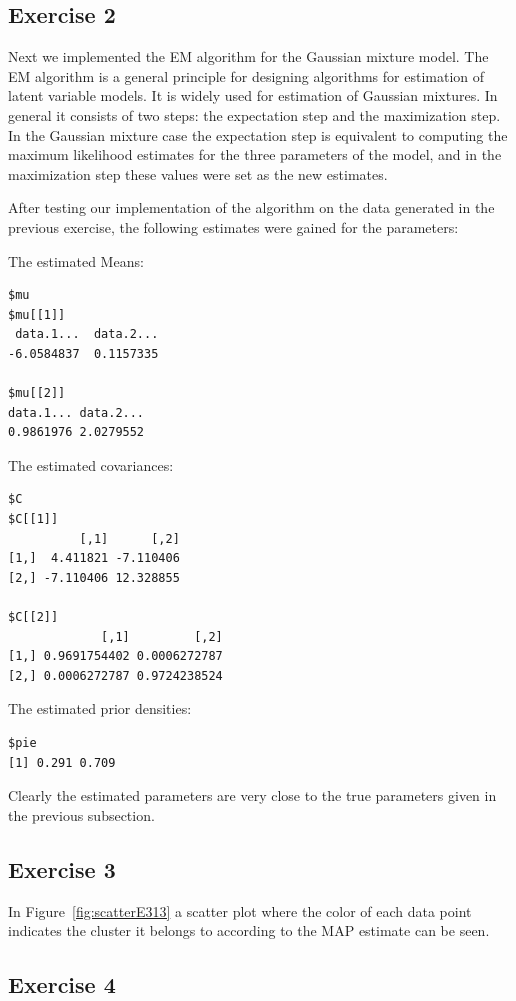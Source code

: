 \documentclass{article}
\begin{document}
\subsection{Exercise 2}
Next we implemented the EM algorithm for the Gaussian mixture
model. The EM algorithm is a general principle for designing
algorithms for estimation of latent variable models. It is widely used
for estimation of Gaussian mixtures. In general it consists of two
steps: the expectation step and the maximization step. In the Gaussian
mixture case the expectation step is equivalent to computing the
maximum likelihood estimates for the three parameters of the model,
and in the maximization step these values were set as the new
estimates.

After testing our implementation of the algorithm on the data generated in the previous
exercise, the following estimates were gained for the parameters:

\noindent The estimated Means:
\begin{verbatim}
$mu
$mu[[1]]
 data.1...  data.2... 
-6.0584837  0.1157335 

$mu[[2]]
data.1... data.2... 
0.9861976 2.0279552 
\end{verbatim}

\noindent The estimated covariances:
\begin{verbatim}
$C
$C[[1]]
          [,1]      [,2]
[1,]  4.411821 -7.110406
[2,] -7.110406 12.328855

$C[[2]]
             [,1]         [,2]
[1,] 0.9691754402 0.0006272787
[2,] 0.0006272787 0.9724238524
\end{verbatim}

\noindent The estimated prior densities:
\begin{verbatim}
$pie
[1] 0.291 0.709
\end{verbatim}

Clearly the estimated parameters are very close to the true parameters
given in the previous subsection.

\subsection{Exercise 3}

In Figure~\ref{fig:scatterE313} a scatter plot where the color of each data
point indicates the cluster it belongs to according to the MAP
estimate can be seen.

\subsection{Exercise 4}
\end{document}

